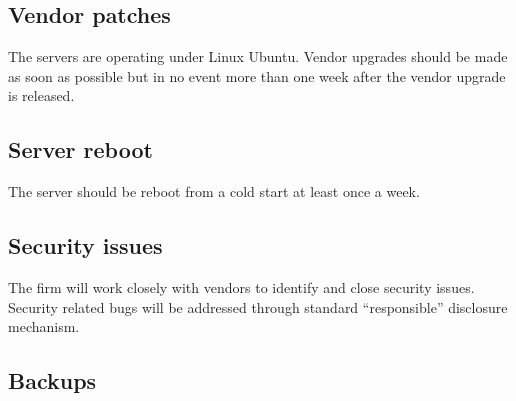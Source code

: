 \subsection{Vendor patches}
The servers are operating under Linux Ubuntu.  Vendor upgrades should
be made as soon as possible but in no event more than one week after
the vendor upgrade is released.

\subsection{Server reboot}
The server should be reboot from a cold start at least once a week.

\subsection{Security issues}
The firm will work closely with vendors to identify and close security
issues.  Security related bugs will be addressed through standard
``responsible'' disclosure mechanism.

\subsection{Backups}


